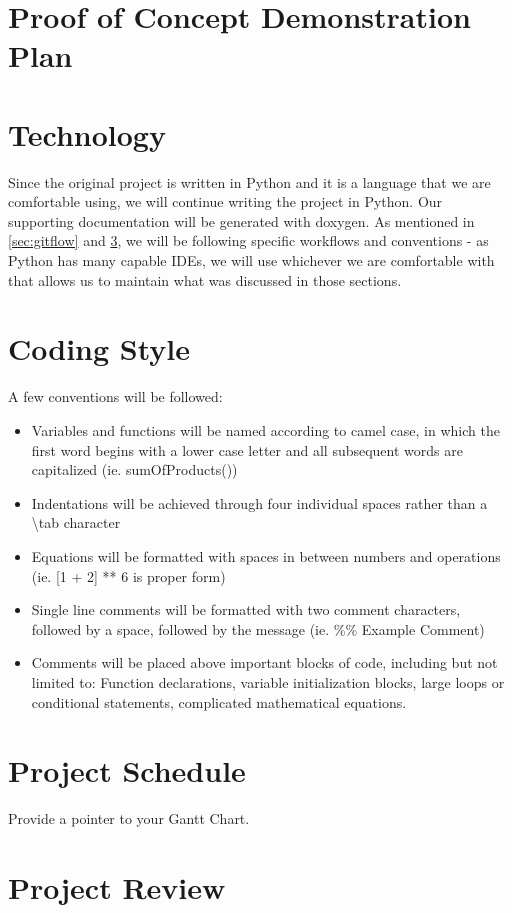 \documentclass{article}
\begin{document}
\section{Proof of Concept Demonstration Plan}

\section{Technology}
Since the original project is written in Python and it is a language that we are comfortable using, we will continue writing the project in Python. Our supporting documentation will be generated with doxygen. As mentioned in \ref{sec:gitflow} and \ref{sec:style}, we will be following specific workflows and conventions - as Python has many capable IDEs, we will use whichever we are comfortable with that allows us to maintain what was discussed in those sections. 
\section{Coding Style} \label{sec:style}
A few conventions will be followed:
\begin{itemize}
  \item Variables and functions will be named according to camel case, in which the first word begins with a lower case letter and all subsequent words are capitalized (ie. sumOfProducts())
  \item Indentations will be achieved through four individual spaces rather than a \textbackslash tab character
  \item Equations will be formatted with spaces in between numbers and operations (ie. [1 + 2] ** 6 is proper form)
  \item Single line comments will be formatted with two comment characters, followed by a space, followed by the message (ie. \%\% Example Comment)
  \item Comments will be placed above important blocks of code, including but not limited to: Function declarations, variable initialization blocks, large loops or conditional statements, complicated mathematical equations. 
\end{itemize}
\section{Project Schedule}

Provide a pointer to your Gantt Chart.

\section{Project Review}
\end{document}
